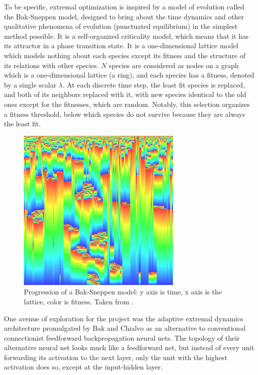 \documentclass[12pt]{article}
\begin{document}
To be specific, extremal optimization is inspired by a model of evolution called the Bak-Sneppen model\cite{baksneppen}, designed to bring about the time dynamics and other qualitative phenomena of evolution (punctuated equilibrium)\cite{gould} in the simplest method possible. It is a self-organized criticality model, which means that it has its attractor in a phase transition state. It is a one-dimensional lattice model which models nothing about each species except its fitness and the structure of its relations with other species. $N$ species are considered as nodes on a graph which is a one-dimensional lattice (a ring), and each species has a fitness, denoted by a single scalar $\lambda$. At each discrete time step, the least fit species is replaced, and both of its neighbors replaced with it, with new species identical to the old ones except for the fitnesses, which are random. Notably, this selection organizes a fitness threshold, below which species do not survive because they are always the least fit.

\begin{figure}
  \includegraphics{bak_sneppen}
  \caption{Progression of a Bak-Sneppen model: y axis is time, x axis is the lattice, color is fitness. Taken from \cite{baksneppen}.}
\end{figure}

One avenue of exploration for the project was the adaptive extremal dynamics architecture promulgated by Bak and Chialvo\cite{bakchialvo} as an alternative to conventional connectionist feedforward backpropagation neural nets. The topology of their alternative neural net looks much like a feedforward net, but instead of every unit forwarding its activation to the next layer, only the unit with the highest activation does so, except at the input-hidden layer.
\end{document}
